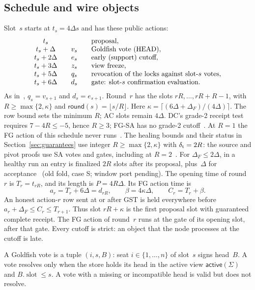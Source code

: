 \documentclass{article}
\theoremstyle{plain}
\theoremstyle{definition}
\theoremstyle{remark}
\newcommand{\slot}{\operatorname{slot}}
\newcommand{\round}{\mathsf{round}}
\newcommand{\act}{\mathsf{active}}
\newcommand{\DC}[1]{\cite[\S#1]{DC}}
\newcommand{\SAS}{\cite{SAS}}
\begin{document}
\subsection{Schedule and wire objects}\label{sec:schedule}

Slot~$s$ starts at $t_s=4\Delta s$ and has these public actions:
\[
\begin{array}{c@{\qquad}c@{\qquad}l}
 t_s        &      & \text{proposal},\\
 t_s+\Delta  & v_s & \text{Goldfish vote (HEAD)},\\
 t_s+2\Delta & e_s & \text{early (support) cutoff},\\
 t_s+3\Delta & z_s & \text{view freeze},\\
 t_s+5\Delta & q_s & \text{revocation of the locks against slot-$s$ votes},\\
 t_s+6\Delta & d_s & \text{gate: slot-$s$ confirmation evaluation}.
\end{array}
\]
As in~\SAS, $q_s=v_{s+1}$ and $d_s=e_{s+1}$.  Round~$r$ has the slots
$rR,\dots,rR+R-1$, with $R\geq\max\{2,\kappa\}$ and $\round(s)=\lfloor s/R\rfloor$.
Here $\kappa=\lceil(6\Delta+\Delta_F)/(4\Delta)\rceil$.
The row bound sets the minimum $R$; AC slots remain $4\Delta$.
DC's grade-2 receipt test requires $7-4R\leq-5$, hence $R\geq3$;
FG-SA has no grade-2 cutoff~\DC{6.1}.
At $R=1$ the FG action of this schedule never runs~\cite[T12]{FL}.
The healing bounds and their status in Section~\ref{sec:guarantees} use
integer $R\geq\max\{2,\kappa\}$ with $\delta_{\rm t}=2R$: the source and pivot
proofs use SA votes and gates, including at $R=2$~\cite[H.21]{BPH}.
For $\Delta_F\leq2\Delta$, in a healthy
run an entry is finalized $2R$ slots after its proposal, plus~$\Delta$
for acceptance~\cite[\S3.5]{FL} (old fold, case S; window port pending).  The opening time of round~$r$ is
$T_r=t_{rR}$, and its length is $P=4R\Delta$.  Its FG action time is
\[
 a_r=T_r+6\Delta=d_{rR},\qquad
 \beta=4\kappa\Delta,\qquad C_r=T_r+\beta.
\]
An honest action-$r$ row sent at or after GST is held everywhere before
$a_r+\Delta_F\leq C_r\leq T_{r+1}$.  Thus slot $rR+\kappa$ is
the first proposal slot with guaranteed complete receipt.
The FG action of round~$r$ runs at the gate of its opening slot,
after that gate.  Every cutoff is strict: an object that the node
processes at the cutoff is late.

A Goldfish vote is a tuple $(i,s,B)$: seat $i\in\{1,\dots,n\}$ of
slot~$s$ signs head~$B$.  A vote resolves only when the store holds its
head in the active view $\act(\Sigma)$ and $B.\slot\leq s$.  A vote with a
missing or incompatible head is valid but does not resolve.
\end{document}
